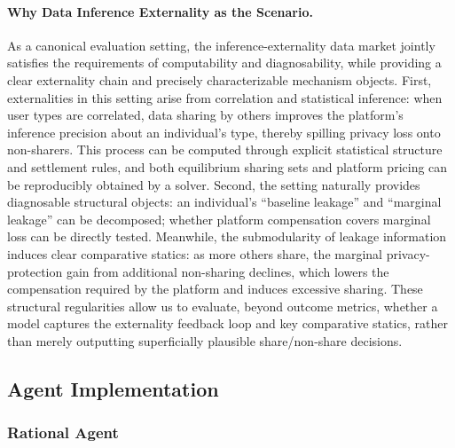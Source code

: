 \documentclass[sigconf,anonymous,review]{acmart}
\theoremstyle{definition}
\begin{document}
\paragraph{\textbf{Why Data Inference Externality as the Scenario.}}
As a canonical evaluation setting, the inference-externality data market jointly satisfies the requirements of computability and diagnosability, while providing a clear externality chain and precisely characterizable mechanism objects. First, externalities in this setting arise from correlation and statistical inference: when user types are correlated, data sharing by others improves the platform's inference precision about an individual's type, thereby spilling privacy loss onto non-sharers. This process can be computed through explicit statistical structure and settlement rules, and both equilibrium sharing sets and platform pricing can be reproducibly obtained by a solver. Second, the setting naturally provides diagnosable structural objects: an individual's ``baseline leakage'' and ``marginal leakage'' can be decomposed; whether platform compensation covers marginal loss can be directly tested. Meanwhile, the submodularity of leakage information induces clear comparative statics: as more others share, the marginal privacy-protection gain from additional non-sharing declines, which lowers the compensation required by the platform and induces excessive sharing. These structural regularities allow us to evaluate, beyond outcome metrics, whether a model captures the externality feedback loop and key comparative statics, rather than merely outputting superficially plausible share/non-share decisions.



\subsection{Agent Implementation}

\subsubsection{Rational Agent}
\label{subsubsec:rational_agent_tmd}
\end{document}
